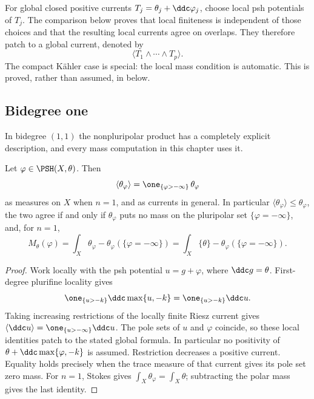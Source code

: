 For global closed positive currents
$T_j=\theta_j+\ddc\varphi_j$, choose local psh potentials of $T_j$.
The comparison below proves that local finiteness is independent of those
choices and that the resulting local currents agree on overlaps.  They
therefore patch to a global current, denoted by
\[
       \langle T_1\wedge\cdots\wedge T_p\rangle .
\tag{51.16}\label{eq:complex-global-npp}
\]
The compact K\"ahler case is special: the local mass condition is automatic.
This is proved, rather than assumed, in
 below.

\subsection{Bidegree one}
\label{sec:ch51-npp-bidegree-one}

In bidegree $(1,1)$ the nonpluripolar product has a completely explicit
description, and every mass computation in this chapter uses it.

\par\noindent\begin{minipage}{\textwidth}
\begin{lemma}\label{lem:ch51-npp-bidegree-one}
Let $\varphi\in\PSH(X,\theta)$.  Then
\[
 \langle\theta_\varphi\rangle
 =\one_{\{\varphi>-\infty\}}\,\theta_\varphi
\]
as measures on $X$ when $n=1$, and as currents in general.  In
particular $\langle\theta_\varphi\rangle\leq\theta_\varphi$, the two
agree if and only if $\theta_\varphi$ puts no mass on the pluripolar
set $\{\varphi=-\infty\}$, and, for $n=1$,
\[
 M_\theta(\varphi)
 =\int_X\theta_\varphi-\theta_\varphi(\{\varphi=-\infty\})
 =\int_X\{\theta\}-\theta_\varphi(\{\varphi=-\infty\}).
\]
\end{lemma}
\end{minipage}\par\medskip

\begin{proof}
Work locally with the psh potential $u=g+\varphi$, where
$\ddc g=\theta$.  First-degree plurifine locality gives
\[
 \one_{\{u>-k\}}\ddc\max\{u,-k\}
            =\one_{\{u>-k\}}\ddc u.
\]
Taking increasing restrictions of the locally finite Riesz current gives
$\langle\ddc u\rangle=\one_{\{u>-\infty\}}\ddc u$.
The pole sets of $u$ and $\varphi$ coincide, so these local identities
patch to the stated global formula.  In particular no positivity of
$\theta+\ddc\max\{\varphi,-k\}$ is assumed.
Restriction decreases a positive current.  Equality holds precisely when
the trace measure of that current gives its pole set zero mass.
For $n=1$, Stokes gives $\int_X\theta_\varphi=\int_X\theta$;
subtracting the polar mass gives the last identity.
\end{proof}

